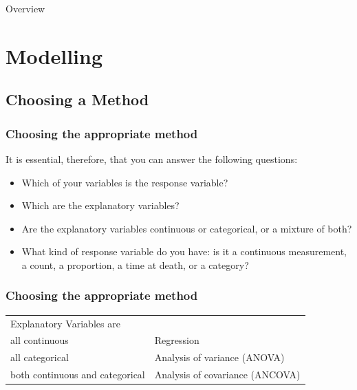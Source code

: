 \begin{frame}
\titlepage
\end{frame}

\begin{frame}{Overview}
  \tableofcontents
\end{frame}

\section{Modelling}

\subsection{Choosing a Method}
\begin{frame}\frametitle{Choosing the appropriate method}
It is essential, therefore, that you can answer the following questions:
\begin{itemize}
\item Which of your variables is the response variable?
\item Which are the explanatory variables?
\item Are the explanatory variables continuous or categorical, or a mixture of both?
\item What kind of response variable do you have: is it a continuous measurement, a count, a proportion, a time at death, or a category?
\end{itemize}
\end{frame}

\begin{frame}\frametitle{Choosing the appropriate method}
\begin{center}\footnotesize
  \begin{tabular}{@{} >{\ttfamily}l l} 
    \rowcolor{gray!40}
Explanatory Variables are & \\
all  continuous                  & Regression                     \\ 
all categorical & Analysis of variance (ANOVA)   \\
both continuous and categorical & Analysis of covariance (ANCOVA)\\
  \end{tabular}
\end{center}
\end{frame}

